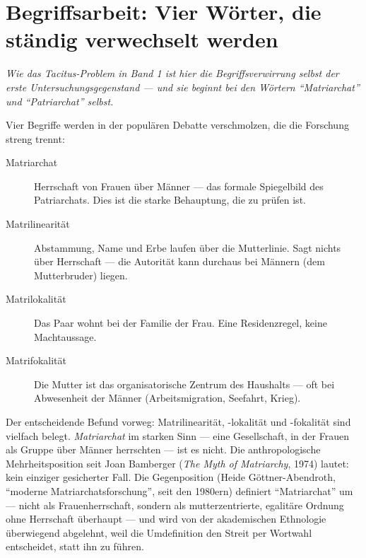 \documentclass[11pt,a4paper,ngerman]{scrartcl}
\newcommand{\chipbase}[2]{\hspace{0pt}{\footnotesize\textcolor{#1}{[\textsc{#2}]}}}
\newcommand{\chipbelegt}[1]{\chipbase{chipgreen}{#1}}
\newcommand{\chipumstritten}[1]{\chipbase{chipred}{#1}}
\begin{document}
\section{Begriffsarbeit: Vier Wörter, die ständig verwechselt werden}
\noindent\textit{Wie das Tacitus-Problem in Band 1 ist hier die Begriffsverwirrung selbst der erste Untersuchungsgegenstand --- und sie beginnt bei den Wörtern \enquote{Matriarchat} und \enquote{Patriarchat} selbst.}
\medskip

Vier Begriffe werden in der populären Debatte verschmolzen, die die Forschung streng trennt: \chipbelegt{belegt}

\begin{description}
\item[Matriarchat] Herrschaft von Frauen über Männer --- das formale Spiegelbild des Patriarchats. Dies ist die starke Behauptung, die zu prüfen ist.
\item[Matrilinearität] Abstammung, Name und Erbe laufen über die Mutterlinie. Sagt nichts über Herrschaft --- die Autorität kann durchaus bei Männern (dem Mutterbruder) liegen.
\item[Matrilokalität] Das Paar wohnt bei der Familie der Frau. Eine Residenzregel, keine Machtaussage.
\item[Matrifokalität] Die Mutter ist das organisatorische Zentrum des Haushalts --- oft bei Abwesenheit der Männer (Arbeitsmigration, Seefahrt, Krieg).
\end{description}

Der entscheidende Befund vorweg: Matrilinearität, -lokalität und -fokalität sind vielfach belegt. \emph{Matriarchat} im starken Sinn --- eine Gesellschaft, in der Frauen als Gruppe über Männer herrschten --- ist es nicht. \chipbelegt{belegt} Die anthropologische Mehrheitsposition seit Joan Bamberger (\emph{The Myth of Matriarchy}, 1974) lautet: kein einziger gesicherter Fall. Die Gegenposition (Heide Göttner-Abendroth, \enquote{moderne Matriarchatsforschung}, seit den 1980ern) definiert \enquote{Matriarchat} um --- nicht als Frauenherrschaft, sondern als mutterzentrierte, egalitäre Ordnung ohne Herrschaft überhaupt --- und wird von der akademischen Ethnologie überwiegend abgelehnt, weil die Umdefinition den Streit per Wortwahl entscheidet, statt ihn zu führen. \chipumstritten{umstritten}
\end{document}

